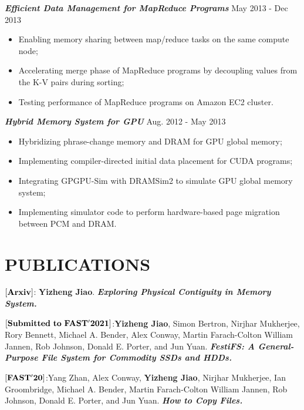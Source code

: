 \documentclass[margin, 10pt]{res} %
\begin{document}
\begin{resume}
{\sl \textbf{Efficient Data Management for MapReduce Programs}} \hfill May 2013 - Dec 2013 \\
\begin{itemize}
\item Enabling memory sharing between map/reduce tasks on the same compute node;
\item Accelerating merge phase of MapReduce programs by decoupling values from the K-V pairs during sorting;
\item Testing performance of MapReduce programs on Amazon EC2 cluster.
\end{itemize} 

{\sl \textbf{Hybrid Memory System for GPU}} \hfill Aug. 2012 - May 2013 \\
\begin{itemize}
\item Hybridizing phrase-change memory and DRAM for GPU global memory;
\item Implementing compiler-directed initial data placement for CUDA programs;
\item Integrating GPGPU-Sim with DRAMSim2 to simulate GPU global memory system;
\item Implementing simulator code to perform hardware-based page migration between PCM and DRAM.
\end{itemize} 

\section{PUBLICATIONS}
$[\bf{Arxiv}]$: \textbf{Yizheng Jiao}. \textbf{\textit{Exploring Physical Contiguity in Memory System.}}


$[\bf{Submitted\ to\ FAST'2021}]$:\textbf{Yizheng Jiao}, Simon Bertron, Nirjhar Mukherjee, Rory Bennett, Michael A. Bender, Alex Conway, Martin Farach-Colton
William Jannen, Rob Johnson, Donald E. Porter, and Jun Yuan. \textbf{\textit{FestiFS: A General-Purpose File System for Commodity SSDs and HDDs.}}

$[\bf{FAST'20}]$:Yang Zhan, Alex Conway, \textbf{Yizheng Jiao}, Nirjhar Mukherjee, Ian Groombridge, Michael A. Bender, Martin Farach-Colton
William Jannen, Rob Johnson, Donald E. Porter, and Jun Yuan. \textbf{\textit{How to Copy Files.}}


\end{resume}
\end{document}
